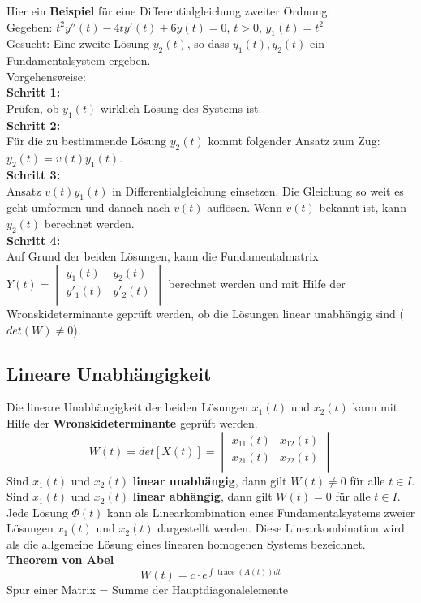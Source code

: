 Hier ein \textbf{Beispiel} für eine Differentialgleichung zweiter Ordnung: \\
Gegeben: $t^2y''(t)-4ty'(t)+6y(t)=0$, $t>0$, $y_1(t)=t^2$\\
Gesucht: Eine zweite Lösung $y_2(t)$, so dass ${y_1(t),y_2(t)}$ ein Fundamentalsystem ergeben. \\
Vorgehensweise: \\
\textbf{Schritt 1:}\\
Prüfen, ob $y_1(t)$ wirklich Lösung des Systems ist. \\
\textbf{Schritt 2:}\\
Für die zu bestimmende Lösung $y_2(t)$ kommt folgender Ansatz zum Zug: $y_2(t) = v(t)y_1(t)$.\\
\textbf{Schritt 3:}\\
Ansatz $v(t)y_1(t)$ in Differentialgleichung einsetzen. Die Gleichung so weit es geht umformen und danach nach $v(t)$ auflösen. Wenn $v(t)$ bekannt ist, kann $y_2(t)$ berechnet werden. \\
\textbf{Schritt 4:}\\
Auf Grund der beiden Lösungen, kann die Fundamentalmatrix $Y(t) =
\begin{vmatrix} 
	        y_{1}(t) & y_{2}(t)\\ 
	        y'_{1}(t) & y'_{2}(t)\\   
\end{vmatrix} $ berechnet werden und mit Hilfe der Wronskideterminante geprüft werden, ob die Lösungen linear unabhängig sind ($det(W) \neq 0$). 

\subsection{Lineare Unabhängigkeit}
Die lineare Unabhängigkeit der beiden Lösungen $x_1(t)$ und $x_2(t)$ kann mit Hilfe der \textbf{Wronskideterminante} geprüft werden. 
\begin{equation*}
	W(t) = det[X(t)] =    
	\begin{vmatrix} 
	        x_{11}(t) & x_{12}(t)\\ 
	        x_{21}(t) & x_{22}(t)\\   
	\end{vmatrix}
\end{equation*}
Sind $x_1(t)$ und $x_2(t)$ \textbf{linear unabhängig}, dann gilt $W(t) \neq 0$ für alle $t \in I$. \\
Sind $x_1(t)$ und $x_2(t)$ \textbf{linear abhängig}, dann gilt $W(t) = 0$ für alle $t \in I$. \\
Jede Lösung $\Phi(t)$ kann als Linearkombination eines Fundamentalsystems zweier Lösungen $x_1(t)$ und $x_2(t)$ dargestellt werden. Diese Linearkombination wird als die allgemeine Lösung eines linearen homogenen Systems bezeichnet. \\
\textbf{Theorem von Abel}\\
\begin{equation*}
W(t) = c\cdot e^{\int{\operatorname{trace}(A(t))dt}}
\end{equation*}
Spur einer Matrix = Summe der Hauptdiagonalelemente

